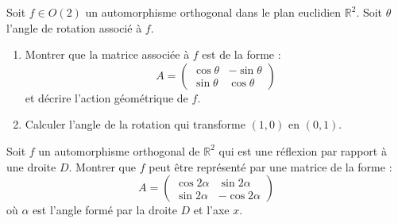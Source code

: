 \begin{exercice}
Soit \( f \in O(2) \) un automorphisme orthogonal dans le plan euclidien \( \mathbb{R}^2 \). Soit \( \theta \) l'angle de rotation associé à \( f \).
\begin{enumerate}
    \item Montrer que la matrice associée à \( f \) est de la forme :
    \[
    A = \begin{pmatrix} \cos \theta & -\sin \theta \\ \sin \theta & \cos \theta \end{pmatrix}
    \]
    et décrire l'action géométrique de \( f \).
    \item Calculer l'angle de la rotation qui transforme \( (1, 0) \) en \( (0, 1) \).
\end{enumerate}
\end{exercice}

\begin{exercice}
Soit \( f \) un automorphisme orthogonal de \( \mathbb{R}^2 \) qui est une réflexion par rapport à une droite \( D \). Montrer que \( f \) peut être représenté par une matrice de la forme :
\[
A = \begin{pmatrix} \cos 2\alpha & \sin 2\alpha \\ \sin 2\alpha & -\cos 2\alpha \end{pmatrix}
\]
où \( \alpha \) est l'angle formé par la droite \( D \) et l'axe \( x \).
\end{exercice}

